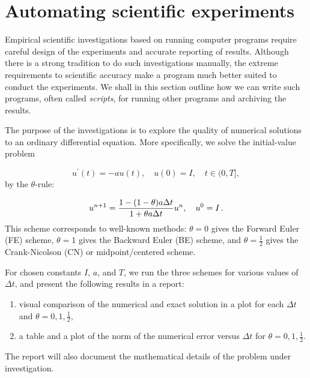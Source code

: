 \documentclass[%
oneside,                 %
final,                   %
10pt]{article}
\newenvironment{notice_mdfboxadmon}[1][]{
\begin{notice_mdfboxmdframed}[frametitle=#1]
}
{
\end{notice_mdfboxmdframed}
}
\begin{document}
\section{Automating scientific experiments}
\label{softeng1:experiments}

Empirical scientific investigations based on running computer programs
require careful design of the experiments and accurate reporting of results.
Although there is a strong tradition to do such investigations manually,
the extreme requirements to scientific accuracy make a program much
better suited to conduct the experiments. We shall in this section outline
how we can write such programs, often called \emph{scripts}, for running other
programs and archiving the results.


\begin{notice_mdfboxadmon}
The purpose of the investigations is to explore the quality of numerical
solutions to an ordinary differential equation. More specifically, we
solve the initial-value problem

\begin{equation}
u^\prime(t) = -au(t),\quad u(0)=I,\quad t\in (0,T],
\label{softeng1:experiments:model}
\end{equation}
by the $\theta$-rule:

\begin{equation}
u^{n+1} = \frac{1 - (1-\theta) a\Delta t}{1 + \theta a\Delta t}u^n,
\quad u^0=I\tp
\label{softeng1:experiments:theta}
\end{equation}
This scheme corresponds to well-known methods: $\theta=0$ gives the
Forward Euler (FE) scheme, $\theta=1$ gives the Backward Euler (BE) scheme,
and $\theta=\frac{1}{2}$ gives the Crank-Nicolson
(CN) or midpoint/centered scheme.

For chosen constants $I$, $a$, and $T$, we run the three schemes for various
values of $\Delta t$, and present the following results in a report:

\begin{enumerate}
\item visual comparison of the numerical and exact solution in a plot for
   each $\Delta t$ and $\theta=0,1,\frac{1}{2}$,

\item a table and a plot of the norm of the numerical error versus $\Delta t$
   for $\theta=0,1,\frac{1}{2}$.
\end{enumerate}

\noindent
The report will also document the mathematical details of the problem under
investigation.
\end{notice_mdfboxadmon}
\end{document}
